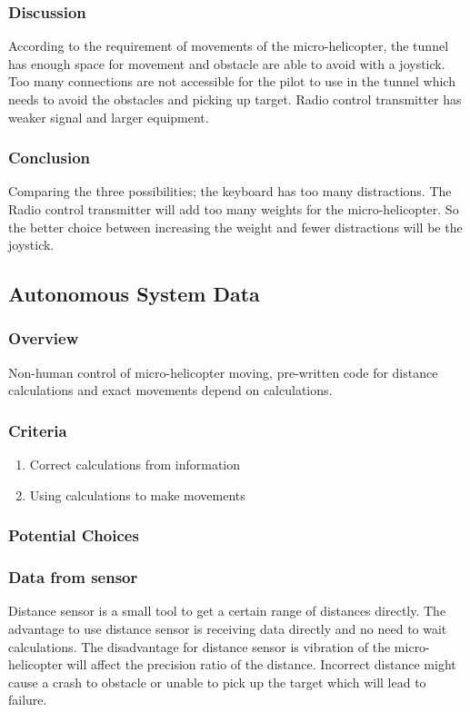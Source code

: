 \documentclass[onecolumn, draftclsnofoot,10pt, compsoc]{IEEEtran}
\begin{document}
\subsubsection{Discussion}
According to the requirement of movements of the micro-helicopter, the tunnel has enough space for movement and obstacle are able to avoid with a joystick. Too many connections are not accessible for the pilot to use in the tunnel which needs to avoid the obstacles and picking up target. Radio control transmitter has weaker signal and larger equipment.

\subsubsection{Conclusion}
Comparing the three possibilities; the keyboard has too many distractions. The Radio control transmitter will add too many weights for the micro-helicopter. So the better choice between increasing the weight and fewer distractions will be the joystick.

\subsection{Autonomous System Data}

\subsubsection{Overview}
Non-human control of micro-helicopter moving, pre-written code for distance calculations and exact movements depend on calculations.

\subsubsection{Criteria}
\begin{enumerate}
\item{Correct calculations from information}
\item{Using calculations to make movements}
\end{enumerate}

\subsubsection{Potential Choices}

\subsubsection{Data from sensor}
Distance sensor is a small tool to get a certain range of distances directly. The advantage to use distance sensor is receiving data directly and no need to wait calculations. The disadvantage for distance sensor is vibration of the micro-helicopter will affect the precision ratio of the distance. Incorrect distance might cause a crash to obstacle or unable to pick up the target which will lead to failure.
\end{document}
